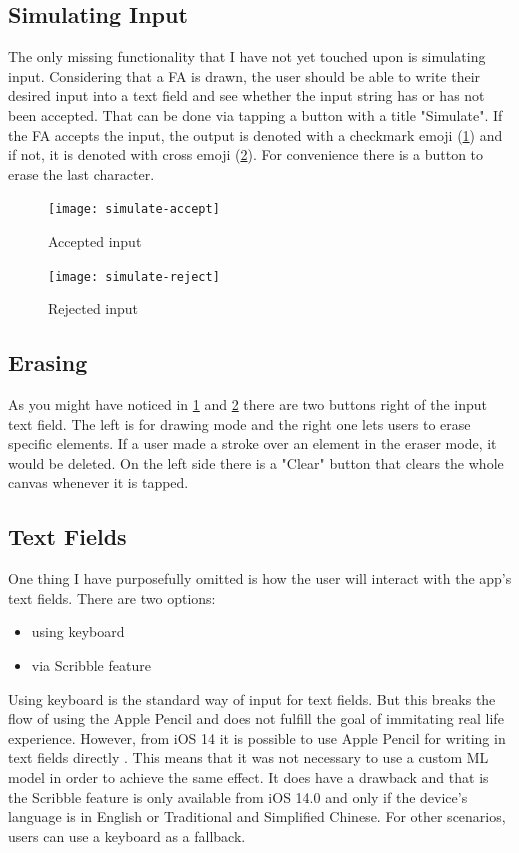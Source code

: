 \subsection{Simulating Input}

The only missing functionality that I have not yet touched upon is simulating input. Considering that a FA is drawn, the user should be able to write their desired input into a text field and see whether the input string has or has not been accepted. That can be done via tapping a button with a title "Simulate". If the FA accepts the input, the output is denoted with a checkmark emoji (\ref{simulate-accept}) and if not, it is denoted with cross emoji (\ref{simulate-reject}). For convenience there is a button to erase the last character.

\begin{figure}
    \texttt{[image: simulate-accept]}
    \caption{Accepted input}\label{simulate-accept}
\end{figure}

\begin{figure}
    \texttt{[image: simulate-reject]}
    \caption{Rejected input}\label{simulate-reject}
\end{figure}

\subsection{Erasing}

As you might have noticed in \ref{simulate-accept} and \ref{simulate-reject} there are two buttons right of the input text field. The left is for drawing mode and the right one lets users to erase specific elements. If a user made a stroke over an element in the eraser mode, it would be deleted. On the left side there is a "Clear" button that clears the whole canvas whenever it is tapped.

\subsection{Text Fields}

One thing I have purposefully omitted is how the user will interact with the app's text fields. There are two options:
\begin{itemize}
    \item using keyboard
    \item via Scribble feature
\end{itemize}

Using keyboard is the standard way of input for text fields. But this breaks the flow of using the Apple Pencil and does not fulfill the goal of immitating real life experience. However, from iOS 14 it is possible to use Apple Pencil for writing in text fields directly \cite{scribble}. This means that it was not necessary to use a custom ML model in order to achieve the same effect. It does have a drawback and that is the Scribble feature is only available from iOS 14.0 and only if the device's language is in English or Traditional and Simplified Chinese. For other scenarios, users can use a keyboard as a fallback.

